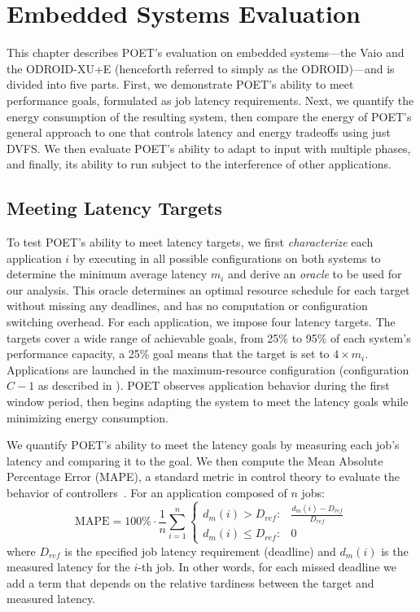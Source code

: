 \section{Embedded Systems Evaluation}
\label{sec:poet-embedded-evaluation}

This chapter describes POET's evaluation on embedded systems---the Vaio and the ODROID-XU+E (henceforth referred to simply as the ODROID)---and is divided into five parts.
First, we demonstrate POET's ability to meet performance goals, formulated as job latency requirements.
Next, we quantify the energy consumption of the resulting system, then compare the energy of POET's general approach to one that controls latency and energy tradeoffs using just DVFS.
We then evaluate POET's ability to adapt to input with multiple phases, and finally, its ability to run subject to the interference of other applications.


\subsection{Meeting Latency Targets}
\label{sec:poet-eval-embedded-performance}

To test POET's ability to meet latency targets, we first \emph{characterize} each application $i$ by executing in all possible configurations on both systems to determine the minimum average latency $m_i$ and derive an \emph{oracle} to be used for our analysis.
This oracle determines an optimal resource schedule for each target without missing any deadlines, and has no computation or configuration switching overhead.
For each application, we impose four latency targets.
The targets cover a wide range of achievable goals, from 25\% to 95\% of each system's performance capacity, \ie a 25\% goal means that the target is set to $4 \times m_i$.
Applications are launched in the maximum-resource configuration (configuration $C-1$ as described in ).
POET observes application behavior during the first window period, then begins adapting the system to meet the latency goals while minimizing energy consumption.

We quantify POET's ability to meet the latency goals by measuring each job's latency and comparing it to the goal.
We then compute the Mean Absolute Percentage Error (MAPE), a standard metric in control theory to evaluate the behavior of controllers~\cite{ICSE2014}.
For an application composed of $n$ jobs:
\begin{equation}
\text{MAPE} = 100\% \cdot \frac{1}{n} \sum\limits_{i=1}^{n}
\left \{
\begin{array}{ll}
d_m(i) > D_{ref}  :& \frac{d_m(i) - D_{ref}}{D_{ref}} \\
d_m(i) \le D_{ref}  :& 0
\end{array} \right.
 \label{eqn:poet-mape}
\end{equation}
where $D_{ref}$ is the specified job latency requirement (deadline) and $d_m(i)$ is the measured latency for the $i$-th job.
In other words, for each missed deadline we add a term that depends on the relative tardiness between the target and measured latency.

